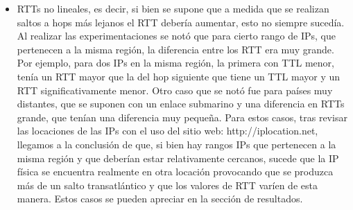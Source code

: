 \begin{itemize}
    \item RTTs no lineales, es decir, si bien se supone que a medida que se realizan saltos a hops más lejanos el RTT debería aumentar, esto no siempre sucedía. Al realizar las experimentaciones se notó que para cierto rango de IPs, que pertenecen a la misma región, la diferencia entre los RTT era muy grande. Por ejemplo, para dos IPs en la misma región, la primera con TTL menor, tenía un RTT mayor que la del hop siguiente que tiene un TTL mayor y un RTT significativamente menor. Otro caso que se notó fue para países muy distantes, que se suponen con un enlace submarino y una diferencia en RTTs grande, que tenían una diferencia muy pequeña. Para estos casos, tras revisar las locaciones de las IPs con el uso del sitio web: http://iplocation.net, llegamos a la conclusión de que, si bien hay rangos IPs que pertenecen a la misma región y que deberían estar relativamente cercanos, sucede que la IP física se encuentra realmente en otra locación provocando que se produzca más de un salto transatlántico y que los valores de RTT varíen de esta manera. Estos casos se pueden apreciar en la sección de resultados.  
\end{itemize}

